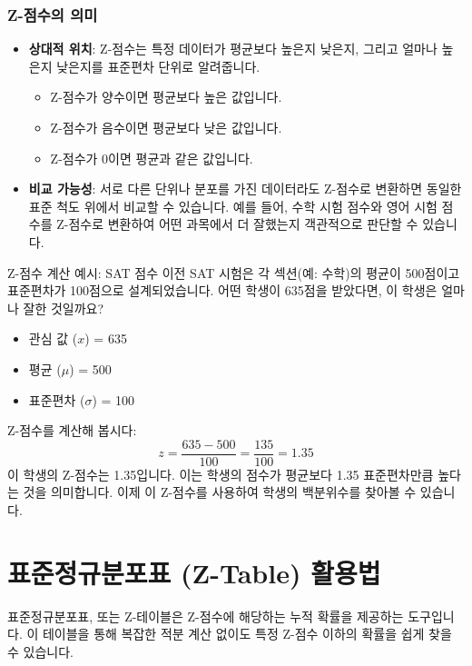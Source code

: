 \documentclass[11pt,a4paper]{article}
\begin{document}
\subsubsection*{Z-점수의 의미}
\begin{itemize}
    \item \textbf{상대적 위치}: Z-점수는 특정 데이터가 평균보다 높은지 낮은지, 그리고 얼마나 높은지 낮은지를 표준편차 단위로 알려줍니다.
        \begin{itemize}
            \item Z-점수가 양수이면 평균보다 높은 값입니다.
            \item Z-점수가 음수이면 평균보다 낮은 값입니다.
            \item Z-점수가 0이면 평균과 같은 값입니다.
        \end{itemize}
    \item \textbf{비교 가능성}: 서로 다른 단위나 분포를 가진 데이터라도 Z-점수로 변환하면 동일한 표준 척도 위에서 비교할 수 있습니다. 예를 들어, 수학 시험 점수와 영어 시험 점수를 Z-점수로 변환하여 어떤 과목에서 더 잘했는지 객관적으로 판단할 수 있습니다.
\end{itemize}

\begin{examplebox}{Z-점수 계산 예시: SAT 점수}
이전 SAT 시험은 각 섹션(예: 수학)의 평균이 500점이고 표준편차가 100점으로 설계되었습니다. 어떤 학생이 635점을 받았다면, 이 학생은 얼마나 잘한 것일까요?

\begin{itemize}
    \item 관심 값 ($x$) = 635
    \item 평균 ($\mu$) = 500
    \item 표준편차 ($\sigma$) = 100
\end{itemize}
Z-점수를 계산해 봅시다:
\[ z = \frac{635 - 500}{100} = \frac{135}{100} = 1.35 \]
이 학생의 Z-점수는 1.35입니다. 이는 학생의 점수가 평균보다 1.35 표준편차만큼 높다는 것을 의미합니다. 이제 이 Z-점수를 사용하여 학생의 백분위수를 찾아볼 수 있습니다.
\end{examplebox}

\newpage
\section*{표준정규분포표 (Z-Table) 활용법}
표준정규분포표, 또는 Z-테이블은 Z-점수에 해당하는 누적 확률을 제공하는 도구입니다. 이 테이블을 통해 복잡한 적분 계산 없이도 특정 Z-점수 이하의 확률을 쉽게 찾을 수 있습니다.
\end{document}
